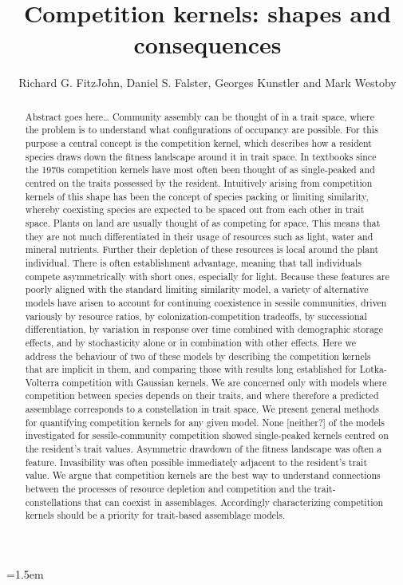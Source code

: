 \documentclass[a4paper,11pt]{article}
\title{Competition kernels: shapes and consequences}
\author{Richard G. FitzJohn, Daniel S. Falster, Georges Kunstler and Mark Westoby}
\date{}
\affiliation{Department of Biological Sciences, Macquarie University,
  Sydney, Australia}
\begin{document}

\mstitlepage
\parindent=1.5em
\addtolength{\parskip}{.3em}

\begin{abstract}
Abstract goes here\ldots
Community assembly can be thought of in a trait space, where the problem is to understand what configurations of occupancy are possible. For this purpose a central concept is the competition kernel, which describes how a resident species draws down the fitness landscape around it in trait space. In textbooks since the 1970s competition kernels have most often been thought of as single-peaked and centred on the traits possessed by the resident. Intuitively arising from competition kernels of this shape has been the concept of species packing or limiting similarity, whereby coexisting species are expected to be spaced out from each other in trait space.
Plants on land are usually thought of as competing for space. This means that they are not much differentiated in their usage of resources such as light, water and mineral nutrients. Further their depletion of these resources is local around the plant individual. There is often establishment advantage, meaning that tall individuals compete asymmetrically with short ones, especially for light. Because these features are poorly aligned with the standard limiting similarity model, a variety of alternative models have arisen to account for continuing coexistence in sessile communities, driven variously by resource ratios, by colonization-competition tradeoffs, by successional differentiation, by variation in response over time combined with demographic storage effects, and by stochasticity alone or in combination with other effects.
Here we address the behaviour of two of these models by describing the competition kernels that are implicit in them, and comparing those with results long established for Lotka-Volterra competition with Gaussian kernels. We are concerned only with models where competition between species depends on their traits, and where therefore a predicted assemblage corresponds to a constellation in trait space. We present general methods for quantifying competition kernels for any given model.
None [neither?] of the models investigated for sessile-community competition showed single-peaked kernels centred on the resident's trait values. Asymmetric drawdown of the fitness landscape was often a feature. Invasibility was often possible immediately adjacent to the resident's trait value. We argue that competition kernels are the best way to understand connections between the processes of resource depletion and competition and the trait-constellations that can coexist in assemblages. Accordingly characterizing competition kernels should be a priority for trait-based assemblage models.

\end{abstract}
\end{document}
